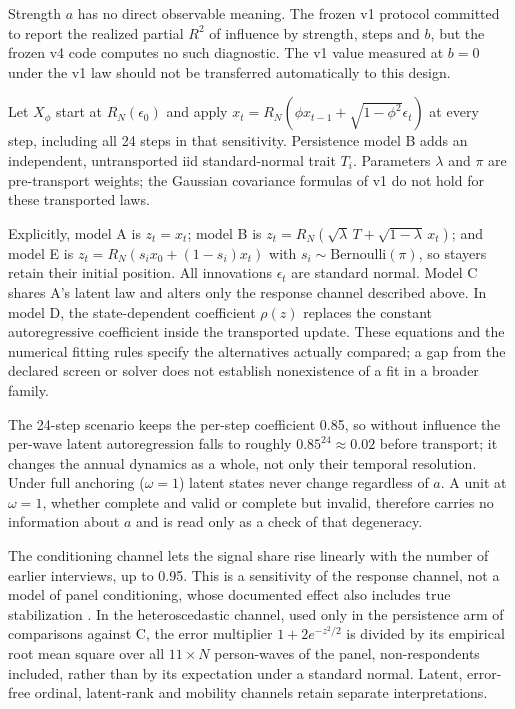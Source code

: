 Strength $a$ has no direct observable meaning. The frozen v1 protocol committed to report the realized partial $R^2$ of influence by strength, steps and $b$, but the frozen v4 code computes no such diagnostic. The v1 value measured at $b=0$ under the v1 law should not be transferred automatically to this design.

Let $X_\phi$ start at $R_N(\epsilon_0)$ and apply $x_t=R_N(\phi x_{t-1}+\sqrt{1-\phi^2}\epsilon_t)$ at every step, including all 24 steps in that sensitivity. Persistence model B adds an independent, untransported iid standard-normal trait $T_i$. Parameters $\lambda$ and $\pi$ are pre-transport weights; the Gaussian covariance formulas of v1 do not hold for these transported laws.

Explicitly, model A is $z_t=x_t$; model B is $z_t=R_N(\sqrt\lambda\,T+\sqrt{1-\lambda}\,x_t)$; and model E is $z_t=R_N(s_ix_0+(1-s_i)x_t)$ with $s_i\sim\mathrm{Bernoulli}(\pi)$, so stayers retain their initial position. All innovations $\epsilon_t$ are standard normal. Model C shares A's latent law and alters only the response channel described above. In model D, the state-dependent coefficient $\rho(z)$ replaces the constant autoregressive coefficient inside the transported update. These equations and the numerical fitting rules specify the alternatives actually compared; a gap from the declared screen or solver does not establish nonexistence of a fit in a broader family.

The 24-step scenario keeps the per-step coefficient 0.85, so without influence the per-wave latent autoregression falls to roughly $0.85^{24}\approx0.02$ before transport; it changes the annual dynamics as a whole, not only their temporal resolution. Under full anchoring ($\omega=1$) latent states never change regardless of $a$. A unit at $\omega=1$, whether complete and valid or complete but invalid, therefore carries no information about $a$ and is read only as a check of that degeneracy.

The conditioning channel lets the signal share rise linearly with the number of earlier interviews, up to 0.95. This is a sensitivity of the response channel, not a model of panel conditioning, whose documented effect also includes true stabilization \cite{kraemer2025}. In the heteroscedastic channel, used only in the persistence arm of comparisons against C, the error multiplier $1+2e^{-z^2/2}$ is divided by its empirical root mean square over all $11\times N$ person-waves of the panel, non-respondents included, rather than by its expectation under a standard normal. Latent, error-free ordinal, latent-rank and mobility channels retain separate interpretations.

